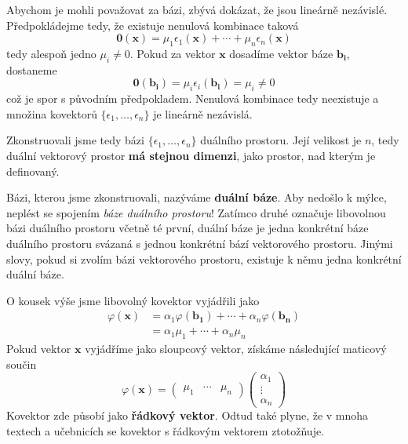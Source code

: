 \documentclass[a5paper,12pt]{amsbook}
\theoremstyle{definition}
\newcommand{\myscalar}[1]{#1}
\newcommand{\myvec}[1]{\mathbf{#1}}
\newcommand{\mymap}[1]{#1}
\begin{document}
Abychom je mohli považovat za bázi, zbývá dokázat, že jsou lineárně nezávislé. Předpokládejme tedy,
že existuje nenulová kombinace taková
\begin{equation*}
\myvec{0}(\myvec{x}) = \myscalar{\mu_1}\mymap{\epsilon_1}(\myvec{x}) + \cdots 
  + \myscalar{\mu_n}\mymap{\epsilon_n}(\myvec{x})
\end{equation*}
tedy alespoň jedno $\myscalar{\mu_i} \neq 0$. Pokud za vektor $\myvec{x}$ dosadíme vektor báze
$\myvec{b_i}$, dostaneme
\begin{equation*}
\myvec{0}(\myvec{b_i}) = \myscalar{\mu_i}\mymap{\epsilon_i}(\myvec{b_i}) = \myscalar{\mu_i} \neq 0
\end{equation*}
což je spor s původním předpokladem. Nenulová kombinace tedy neexistuje a množina kovektorů
$\{\mymap{\epsilon_1}, \ldots, \mymap{\epsilon_n}\}$ je lineárně nezávislá.

Zkonstruovali jsme tedy bázi $\{\mymap{\epsilon_1}, \ldots, \mymap{\epsilon_n}\}$ duálního prostoru.
Její velikost je $n$, tedy duální vektorový prostor \textbf{má stejnou dimenzi}, jako prostor, nad
kterým je definovaný.

Bázi, kterou jsme zkonstruovali, nazýváme \textbf{duální báze}. Aby nedošlo k mýlce, neplést se
spojením \textit{báze duálního prostoru}! Zatímco druhé označuje libovolnou bázi duálního
prostoru včetně té první, duální báze je jedna konkrétní báze duálního prostoru svázaná s
jednou konkrétní bází vektorového prostoru. Jinými slovy, pokud si zvolím bázi vektorového
prostoru, existuje k němu jedna konkrétní duální báze.

O kousek výše jsme libovolný kovektor vyjádřili jako
\begin{equation*}
\begin{split}
\mymap{\varphi}(\myvec{x}) &= \myscalar{\alpha_1}\mymap{\varphi}(\myvec{b_1}) + \cdots
  + \myscalar{\alpha_n}\mymap{\varphi}(\myvec{b_n}) \\
&= \myscalar{\alpha_1}\myscalar{\mu_1} + \cdots + \myscalar{\alpha_n}\myscalar{\mu_n}
\end{split}
\end{equation*}
Pokud vektor $\myvec{x}$ vyjádříme jako sloupcový vektor, získáme následující maticový součin
\begin{equation*}
\mymap{\varphi}(\myvec{x}) = \left(\begin{array}{ccc}
\myscalar{\mu_1} & \cdots & \myscalar{\mu_n}
\end{array}\right)\left(\begin{array}{c}
\myscalar{\alpha_1}\\
\vdots\\
\myscalar{\alpha_n}
\end{array}\right)
\end{equation*}
Kovektor zde působí jako \textbf{řádkový vektor}. Odtud také plyne, že v mnoha textech a učebnicích
se kovektor s řádkovým vektorem ztotožňuje.
\end{document}
